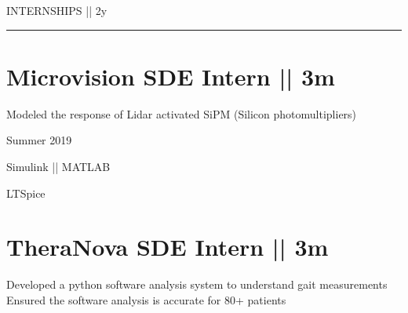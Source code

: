 \vspace{-1.4ex}
{
\hspace{-1.72in}\noindent\color{cblue}
{INTERNSHIPS  } 
{\small \color{black} || 2y}
}

\vspace{-1.6ex}

{\hspace{-1.73in}\noindent\color{dblue}\rule{6.935in}{0.4pt}}  

\vspace{2.5ex}

\section
{\textbf{Microvision}
\newline
SDE Intern || 3m
\newline}


\vspace{-2.5ex}
\begin{detail}
\BulletItem
Modeled the response of Lidar activated SiPM (Silicon photomultipliers) 
\end{detail}

\begin{subtitle}
\vspace{-5ex}
{{Summer 2019}} 
\end{subtitle}

\vspace{-1.5ex}
{
\vspace{-0.8ex}
\color{cyan}\small
{Simulink || MATLAB} 
}

{
\vspace{-2.5ex}\hspace{1.5in}
\color{cyan}\small
{LTSpice} 
}

\vspace{0.8ex}
\section
{\textbf{TheraNova}
\newline
SDE Intern || 3m
}

\BulletItem
\vspace{-2.5ex}
\begin{detail}

\BulletItem
 Developed a python software analysis system to understand gait measurements
\BulletItem
 Ensured the software analysis is accurate for 80+ patients
\end{detail}

